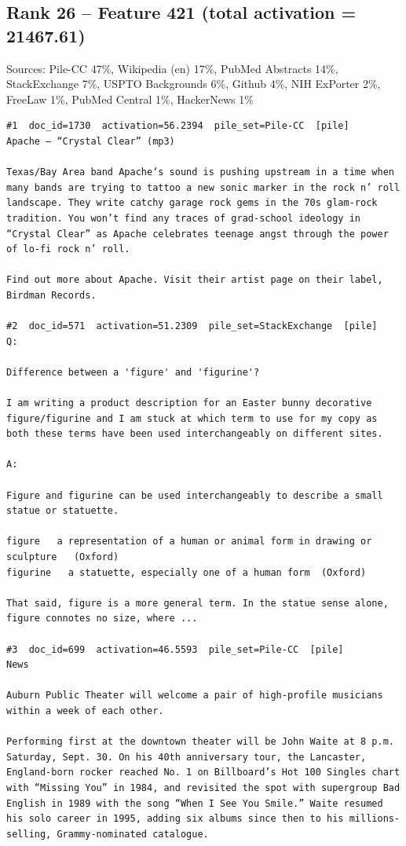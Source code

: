 \subsection*{Rank 26 -- Feature 421 (total activation = 21467.61)}

Sources: Pile-CC 47\%, Wikipedia (en) 17\%, PubMed Abstracts 14\%, StackExchange 7\%, USPTO Backgrounds 6\%, Github 4\%, NIH ExPorter 2\%, FreeLaw 1\%, PubMed Central 1\%, HackerNews 1\%

\begin{verbatim}
#1  doc_id=1730  activation=56.2394  pile_set=Pile-CC  [pile]
Apache – “Crystal Clear” (mp3)

Texas/Bay Area band Apache‘s sound is pushing upstream in a time when many bands are trying to tattoo a new sonic marker in the rock n’ roll landscape. They write catchy garage rock gems in the 70s glam-rock tradition. You won’t find any traces of grad-school ideology in “Crystal Clear” as Apache celebrates teenage angst through the power of lo-fi rock n’ roll.

Find out more about Apache. Visit their artist page on their label, Birdman Records.

#2  doc_id=571  activation=51.2309  pile_set=StackExchange  [pile]
Q:

Difference between a 'figure' and 'figurine'?

I am writing a product description for an Easter bunny decorative figure/figurine and I am stuck at which term to use for my copy as both these terms have been used interchangeably on different sites. 

A:

Figure and figurine can be used interchangeably to describe a small statue or statuette.

figure   a representation of a human or animal form in drawing or sculpture   (Oxford)
figurine   a statuette, especially one of a human form  (Oxford)

That said, figure is a more general term. In the statue sense alone, figure connotes no size, where ...

#3  doc_id=699  activation=46.5593  pile_set=Pile-CC  [pile]
News

Auburn Public Theater will welcome a pair of high-profile musicians within a week of each other.

Performing first at the downtown theater will be John Waite at 8 p.m. Saturday, Sept. 30. On his 40th anniversary tour, the Lancaster, England-born rocker reached No. 1 on Billboard’s Hot 100 Singles chart with “Missing You” in 1984, and revisited the spot with supergroup Bad English in 1989 with the song “When I See You Smile.” Waite resumed his solo career in 1995, adding six albums since then to his millions-selling, Grammy-nominated catalogue.


\end{verbatim}
